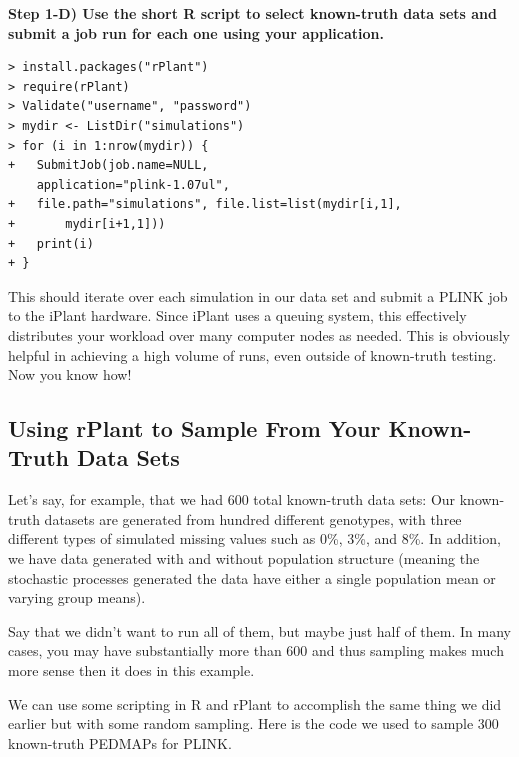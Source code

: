 \documentclass[twoside,a4paper]{refart}
\begin{document}
\textbf{Step 1-D) Use the short R script to select known-truth data sets and submit a job run for each one using your application.}

\begin{center}
\begin{lstlisting}[frame=single]
> install.packages("rPlant")
> require(rPlant)
> Validate("username", "password")
> mydir <- ListDir("simulations")
> for (i in 1:nrow(mydir)) {
+	SubmitJob(job.name=NULL, 
	application="plink-1.07ul", 
+	file.path="simulations", file.list=list(mydir[i,1], 
+		mydir[i+1,1]))
+	print(i)
+ }
\end{lstlisting}
\end{center}

This should iterate over each simulation in our data set and submit a PLINK job to the iPlant hardware. Since iPlant uses a queuing system, this effectively distributes your workload over many computer nodes as needed. This is obviously helpful in achieving a high volume of runs, even outside of known-truth testing. Now you know how!

\subsection{Using rPlant to Sample From Your Known-Truth Data Sets}

Let's say, for example, that we had 600 total known-truth data sets: Our known-truth datasets are generated from hundred different genotypes, with three different types of simulated missing values such as 0\%, 3\%, and 8\%. In addition, we have data generated with and without population structure (meaning the stochastic processes generated the data have either a single population mean or varying group means). 

Say that we didn't want to run all of them, but maybe just half of them. In many cases, you may have substantially more than 600 and thus sampling makes much more sense then it does in this example. 

We can use some scripting in R and rPlant to accomplish the same thing we did earlier but with some random sampling. Here is the code we used to sample 300 known-truth PEDMAPs for PLINK.
\end{document}
